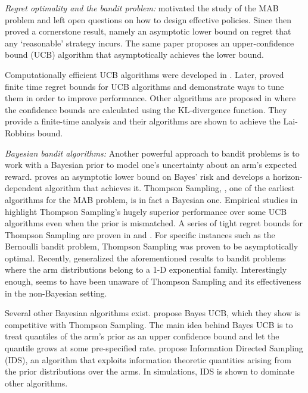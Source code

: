 \noindent\emph{Regret optimality and the bandit problem: }\cite{robbins1952some} motivated the study of the MAB problem and left open questions on how to design effective policies. Since then \cite{lai1985asymptotically} proved a cornerstone result, namely an asymptotic lower bound on regret that any `reasonable' strategy incurs. The same paper proposes an upper-confidence bound (UCB) algorithm that asymptotically achieves the  lower bound.

Computationally efficient UCB algorithms were developed in \cite{agrawal1995sample,katehakis1995sequential}. Later, \cite{auer2002finite,audibert2010regret} proved finite time regret bounds for UCB algorithms and demonstrate ways to tune them in order to improve performance. Other algorithms are proposed in \cite{garivier2011kl,maillard2011finite} where the confidence bounds are calculated using the KL-divergence function. They provide a finite-time analysis and their algorithms are shown to achieve the Lai-Robbins bound.

\noindent\emph{Bayesian bandit algorithms: } Another powerful approach to bandit problems is to work with a Bayesian prior to model one's uncertainty about an arm's expected reward. \cite{lai1987adaptive}  proves an asymptotic lower bound on Bayes' risk and develops a horizon-dependent algorithm that achieves it.
Thompson Sampling, \cite{thompson1933likelihood}, one of the earliest algorithms for the MAB problem, is in fact a Bayesian one. Empirical studies in \cite{chapelle2011empirical,scott2010modern} highlight Thompson Sampling's hugely superior performance over some UCB algorithms even when the prior is mismatched. A series of tight regret bounds for Thompson Sampling are proven in \cite{agrawalanalysis,agrawal2013further} and \cite{kaufmann2012thompson}. For specific instances such as the Bernoulli bandit problem, Thompson Sampling was proven to be asymptotically optimal. Recently, \cite{korda2013thompson} generalized the aforementioned results to bandit problems where the arm distributions belong to a 1-D exponential family. Interestingly enough, \cite{robbins1952some} seems to have been unaware of Thompson Sampling and its effectiveness in the non-Bayesian setting.

Several other Bayesian algorithms exist. \cite{kaufmann2012thompson} propose Bayes UCB, which they show is competitive with Thompson Sampling. The main idea behind Bayes UCB is to treat quantiles of the arm's prior as an upper confidence bound and let the quantile grows at some pre-specified rate. \cite{russo2014learning} propose Information Directed Sampling (IDS), an algorithm that exploits information theoretic quantities arising from the prior distributions over the arms. In simulations, IDS is shown to dominate other algorithms.

